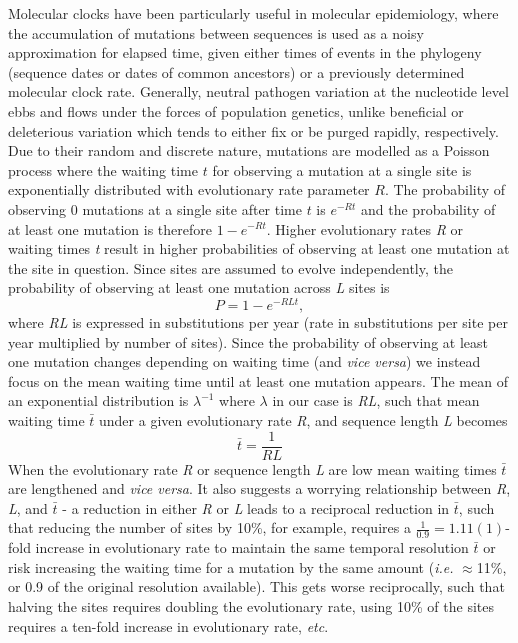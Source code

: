 \documentclass[11pt,oneside,letterpaper]{article}
\begin{document}
Molecular clocks have been particularly useful in molecular epidemiology, where the accumulation of mutations between sequences is used as a noisy approximation for elapsed time, given either times of events in the phylogeny (sequence dates or dates of common ancestors) or a previously determined molecular clock rate.
Generally, neutral pathogen variation at the nucleotide level ebbs and flows under the forces of population genetics, unlike beneficial or deleterious variation which tends to either fix or be purged rapidly, respectively.
Due to their random and discrete nature, mutations are modelled as a Poisson process \citep{yang_computational_2006} where the waiting time $t$ for observing a mutation at a single site is exponentially distributed with evolutionary rate parameter $R$.
The probability of observing 0 mutations at a single site after time $t$ is $e^{-Rt}$ and the probability of at least one mutation is therefore $1-e^{-Rt}$.
Higher evolutionary rates \textit{R} or waiting times \textit{t} result in higher probabilities of observing at least one mutation at the site in question.
Since sites are assumed to evolve independently, the probability of observing at least one mutation across \textit{L} sites is
\begin{equation}
  P = 1-e^{-RLt},
\end{equation}
where \textit{RL} is expressed in substitutions per year (rate in substitutions per site per year multiplied by number of sites).
Since the probability of observing at least one mutation changes depending on waiting time (and \textit{vice versa}) we instead focus on the mean waiting time until at least one mutation appears.
The mean of an exponential distribution is $\lambda^{-1}$ where $\lambda$ in our case is \textit{RL}, such that mean waiting time $\bar{t}$ under a given evolutionary rate \textit{R}, and sequence length \textit{L} becomes
\begin{equation}
  \bar{t} = \frac{1}{RL}
  \label{horizon}
\end{equation}
When the evolutionary rate \textit{R} or sequence length \textit{L} are low mean waiting times $\bar{t}$ are lengthened and \textit{vice versa}.
It also suggests a worrying relationship between \textit{R}, \textit{L}, and $\bar{t}$ - a reduction in either \textit{R} or \textit{L} leads to a reciprocal reduction in $\bar{t}$, such that reducing the number of sites by 10\%, for example, requires a $\frac{1}{0.9} = 1.11(1)$-fold increase in evolutionary rate to maintain the same temporal resolution $\bar{t}$ or risk increasing the waiting time for a mutation by the same amount (\textit{i.e.} $\approx$11\%, or 0.9 of the original resolution available).
This gets worse reciprocally, such that halving the sites requires doubling the evolutionary rate, using 10\% of the sites requires a ten-fold increase in evolutionary rate, \textit{etc}.
\end{document}
